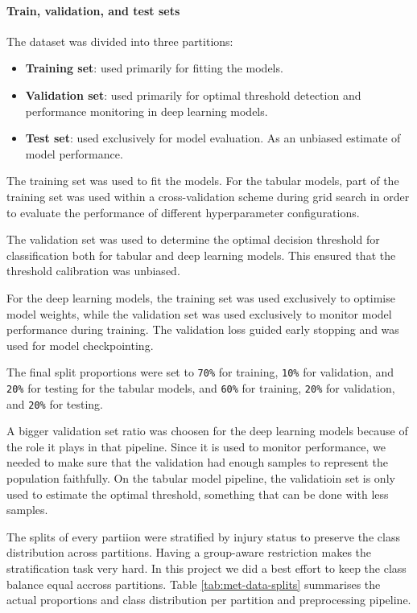 \paragraph{Train, validation, and test sets}
The dataset was divided into three partitions:
\begin{itemize}
    \item \textbf{Training set}: used primarily for fitting the models.
    \item \textbf{Validation set}: used primarily for optimal threshold detection and performance monitoring in deep learning models.
    \item \textbf{Test set}: used exclusively for model evaluation. As an unbiased estimate of model performance.
\end{itemize}

The training set was used to fit the models. For the tabular models, part of the training set was used  within a cross-validation scheme during grid search in order to evaluate the performance of different hyperparameter configurations.

The validation set was used to determine the optimal decision threshold for classification both for tabular and deep learning models. This ensured that the threshold calibration was unbiased.

For the deep learning models, the training set was used exclusively to optimise model weights, while the validation set was used exclusively to monitor model performance during training. The validation loss guided early stopping and was used for model checkpointing.

The final split proportions were set to \texttt{70\%} for training, \texttt{10\%} for validation, and \texttt{20\%} for testing for the tabular models, and \texttt{60\%} for training, \texttt{20\%} for validation, and \texttt{20\%} for testing.

A bigger validation set ratio was choosen for the deep learning models because of the role it plays in that pipeline. Since it is used to monitor performance, we needed to make sure that the validation had enough samples to represent the population faithfully. On the tabular model pipeline, the validatioin set is only used to estimate the optimal threshold, something that can be done with less samples.

The splits of every partiion were stratified by injury status to preserve the class distribution across partitions. Having a group-aware restriction makes the stratification task very hard. In this project we did a best effort to keep the class balance equal accross partitions. Table \ref{tab:met-data-splits} summarises the actual proportions and class distribution per partition and preprocessing pipeline.


